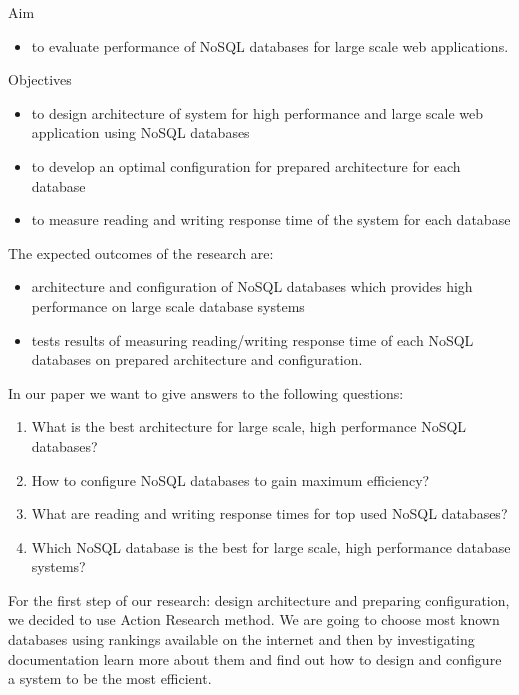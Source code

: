 \documentclass[times, 10pt,twocolumn]{article}
\begin{document}
Aim
\begin{itemize}
	\item to evaluate performance of NoSQL databases for large scale web applications.
\end{itemize}

\vspace{1cm}

Objectives
\begin{itemize}
	\item to design architecture of system for high performance and large scale web application using NoSQL databases
	\item to develop an optimal configuration for prepared architecture for each database
	\item to measure reading and writing response time of the system for each database
\end{itemize} 



The expected outcomes of the research are:

\begin{itemize}
  \item architecture and configuration of NoSQL databases which provides high performance on large scale database systems
  \item tests results of measuring reading/writing response time of each NoSQL databases on prepared architecture and configuration.
\end{itemize}


In our paper we want to give answers to the following questions:

\begin{enumerate}
  \item What is the best architecture for large scale, high performance NoSQL databases?
  \item How to configure NoSQL databases to gain maximum efficiency?
  \item What are reading and writing response times for top used NoSQL databases?
  \item Which NoSQL database is the best for large scale, high performance database systems?
\end{enumerate}
 

For the first step of our research: design architecture and preparing configuration, we decided to use Action Research method.
We are going to choose most known databases using rankings available on the internet and then by investigating
documentation learn more about them and find out how to design and configure a system to be the most efficient.
\end{document}
